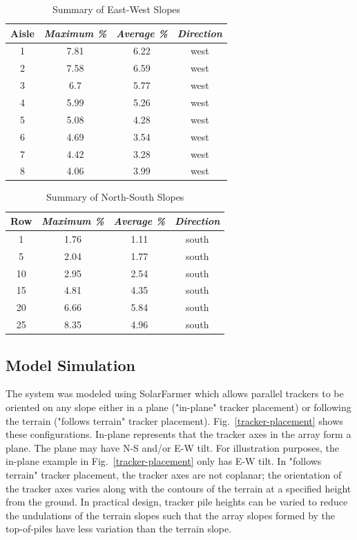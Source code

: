\documentclass[conference]{IEEEtran}
\begin{document}
\begin{table}[htbp]
\caption{Summary of East-West Slopes}
\begin{center}
\begin{tabular}{|c|c|c|c|}
\hline
\textbf{Aisle} & \textbf{\textit{Maximum \%}}& \textbf{\textit{Average \%}}& \textbf{\textit{Direction}} \\
\hline
1& 7.81& 6.22& west \\
\hline
2& 7.58& 6.59& west \\
\hline
3& 6.7& 5.77& west \\
\hline
4&5.99& 5.26& west \\
\hline
5& 5.08& 4.28& west \\
\hline
6& 4.69& 3.54& west \\
\hline
7& 4.42& 3.28& west \\
\hline
8& 4.06& 3.99& west \\
\hline
\end{tabular}
\label{table:ew-slope-summary}
\end{center}
\end{table}

\begin{table}[htbp]
\caption{Summary of North-South Slopes}
\begin{center}
\begin{tabular}{|c|c|c|c|}
\hline
\textbf{Row} & \textbf{\textit{Maximum \%}}& \textbf{\textit{Average \%}}& \textbf{\textit{Direction}} \\
\hline
1&  1.76&  1.11& south \\
\hline
5&  2.04&  1.77& south \\
\hline
10& 2.95&  2.54& south \\
\hline
15& 4.81&  4.35& south \\
\hline
20& 6.66&  5.84& south \\
\hline
25& 8.35&  4.96& south \\
\hline
\end{tabular}
\label{table:row-slope-summary}
\end{center}
\end{table}

\subsection{Model Simulation}

The system was modeled using SolarFarmer \cite{Mikofski_8547323} which allows parallel trackers to be oriented on any slope either in a plane ("in-plane" tracker placement) or following the terrain ("follows terrain" tracker placement). Fig.~\ref{tracker-placement} shows these configurations. In-plane represents that the tracker axes in the array form a plane. The plane may have N-S and/or E-W tilt. For illustration purposes, the in-plane example in Fig.~\ref{tracker-placement} only has E-W tilt. In "follows terrain" tracker placement, the tracker axes are not coplanar; the orientation of the tracker axes varies along with the contours of the terrain at a specified height from the ground. In practical design, tracker pile heights can be varied to reduce the undulations of the terrain slopes such that the array slopes formed by the top-of-piles have less variation than the terrain slope.
\end{document}
